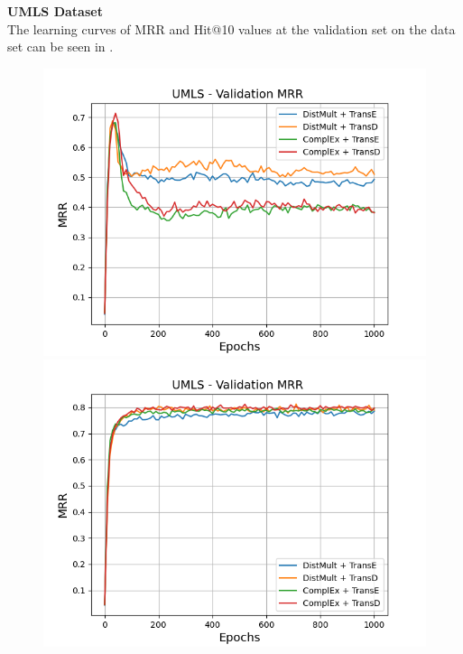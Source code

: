 \textbf{UMLS Dataset}
\label{subsubsec:methods_umls}\\
%
The learning curves of MRR and Hit@10 values at the validation set on the \umls data set can be seen in .
\begin{figure}[H]
    \centering
    \begin{minipage}{.5\textwidth}
      \centering
      \includegraphics[width=0.9\linewidth]{figures/results/gan_train/not_pretrained/uncertainty/max/entropy/umls/1k_epochs/uncertainty_umls_mrrs.png}
    \end{minipage}%
    \begin{minipage}{.5\textwidth}
      \centering
      \includegraphics[width=0.9\linewidth]{figures/results/gan_train/not_pretrained/uncertainty/max_distribution/entropy/umls/1k_epochs/uncertainty_umls_mrrs.png}
    \end{minipage}

\end{figure}
